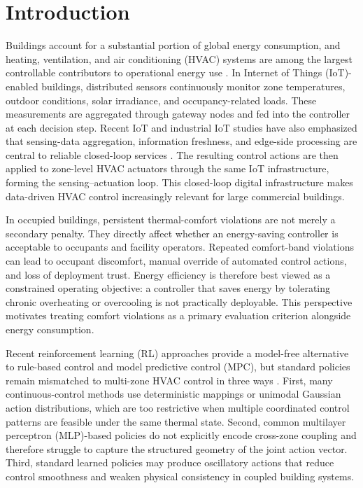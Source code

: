 ﻿\documentclass[conference]{IEEEtran}
\theoremstyle{nonumberplain}
\theoremstyle{plain}
\begin{document}
\section{Introduction}

Buildings account for a substantial portion of global energy consumption, and heating, ventilation, and air conditioning (HVAC) systems are among the largest controllable contributors to operational energy use \cite{perez2008review,cao2016building}. In Internet of Things (IoT)-enabled buildings, distributed sensors continuously monitor zone temperatures, outdoor conditions, solar irradiance, and occupancy-related loads. These measurements are aggregated through gateway nodes and fed into the controller at each decision step. Recent IoT and industrial IoT studies have also emphasized that sensing-data aggregation, information freshness, and edge-side processing are central to reliable closed-loop services \cite{wang2024aoiaggregation,hou2024jointsemantic}. The resulting control actions are then applied to zone-level HVAC actuators through the same IoT infrastructure, forming the sensing--actuation loop. This closed-loop digital infrastructure makes data-driven HVAC control increasingly relevant for large commercial buildings.

In occupied buildings, persistent thermal-comfort violations are not merely a secondary penalty. They directly affect whether an energy-saving controller is acceptable to occupants and facility operators. Repeated comfort-band violations can lead to occupant discomfort, manual override of automated control actions, and loss of deployment trust. Energy efficiency is therefore best viewed as a constrained operating objective: a controller that saves energy by tolerating chronic overheating or overcooling is not practically deployable. This perspective motivates treating comfort violations as a primary evaluation criterion alongside energy consumption.

Recent reinforcement learning (RL) approaches provide a model-free alternative to rule-based control and model predictive control (MPC), but standard policies remain mismatched to multi-zone HVAC control in three ways \cite{drgovna2020all,wei2017deep,biemann2021experimental,alsayed2024hvacreview}. First, many continuous-control methods use deterministic mappings or unimodal Gaussian action distributions, which are too restrictive when multiple coordinated control patterns are feasible under the same thermal state. Second, common multilayer perceptron (MLP)-based policies do not explicitly encode cross-zone coupling and therefore struggle to capture the structured geometry of the joint action vector. Third, standard learned policies may produce oscillatory actions that reduce control smoothness and weaken physical consistency in coupled building systems.
\end{document}
